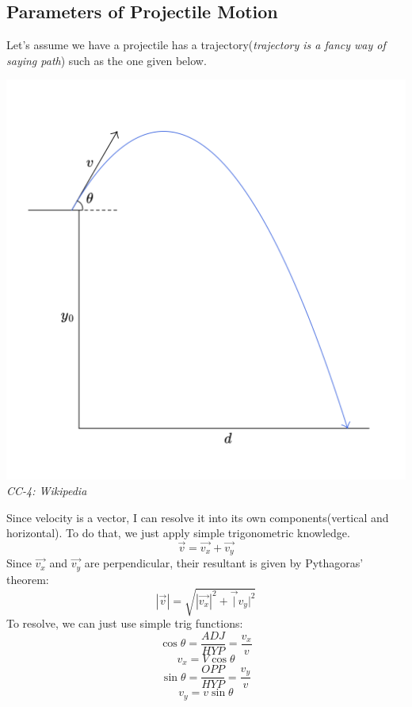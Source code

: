 \documentclass[9pt]{article}
\begin{document}
	\subsection*{Parameters of Projectile Motion}
	Let's assume we have a projectile has a trajectory(\textit{trajectory is a fancy way of saying path}) such as the one given below.
	\begin{center}
		\includegraphics*[scale=0.15]{Projectile_Trajectory}\\
		\textit{CC-4: Wikipedia}
	\end{center}
	Since velocity is a vector, I can resolve it into its own components(vertical and horizontal). To do that, we just apply simple trigonometric knowledge.
	$$\vec{v}=\vec{v_x}+\vec{v_y}$$
	Since $\vec{v_x}$ and $\vec{v_y}$ are perpendicular, their resultant is given by Pythagoras' theorem:
	$$|\vec{v}|=\sqrt{|\vec{v_x}|^2+\vec|{v_y}|^2}$$
	To resolve, we can just use simple trig functions:
	$$\cos\theta=\dfrac{ADJ}{HYP}=\dfrac{v_x}{v}$$
	$$v_x=V\cos\theta$$
	$$\sin\theta=\dfrac{OPP}{HYP}=\dfrac{v_y}{v}$$
	$$v_y=v\sin\theta$$
\end{document}
